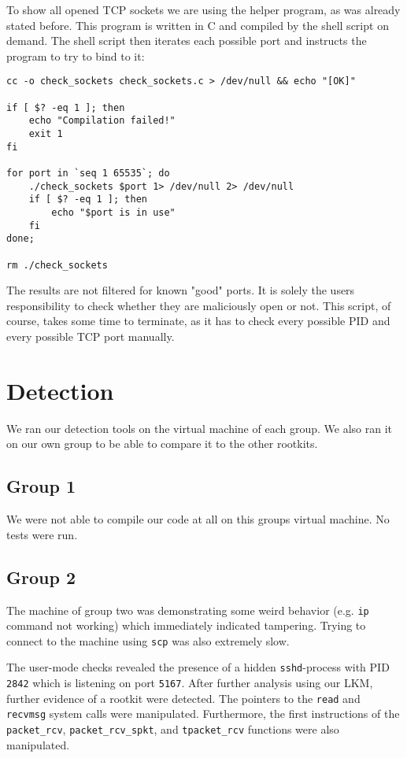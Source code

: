 \documentclass[10pt, letterpaper]{scrartcl}
\begin{document}
To show all opened TCP sockets we are using the helper program, as was already stated before.
This program is written in C and compiled by the shell script on demand.
The shell script then iterates each possible port and instructs the program to try to bind to it:
\begin{lstlisting}
cc -o check_sockets check_sockets.c > /dev/null && echo "[OK]"

if [ $? -eq 1 ]; then
	echo "Compilation failed!"
	exit 1
fi

for port in `seq 1 65535`; do
	./check_sockets $port 1> /dev/null 2> /dev/null
	if [ $? -eq 1 ]; then
		echo "$port is in use"
	fi
done;

rm ./check_sockets
\end{lstlisting}

The results are not filtered for known "good" ports.
It is solely the users responsibility to check whether they are maliciously open or not.
This script, of course, takes some time to terminate, as it has to check every possible PID and every possible TCP port manually.

\section{Detection}\label{sec:detection}
We ran our detection tools on the virtual machine of each group.
We also ran it on our own group to be able to compare it to the other rootkits.
\subsection{Group 1}
We were not able to compile our code at all on this groups virtual machine. No tests were run.

\subsection{Group 2}
The machine of group two was demonstrating some weird behavior (e.g. \texttt{ip} command not working) which immediately indicated tampering.
Trying to connect to the machine using \texttt{scp} was also extremely slow.

The user-mode checks revealed the presence of a hidden \texttt{sshd}-process with PID \texttt{2842} which is listening on port \texttt{5167}.
After further analysis using our LKM, further evidence of a rootkit were detected.
The pointers to the \texttt{read} and \texttt{recvmsg} system calls were manipulated.
Furthermore, the first instructions of the \texttt{packet\_rcv}, \texttt{packet\_rcv\_spkt}, and \texttt{tpacket\_rcv} functions were also manipulated.
\end{document}
